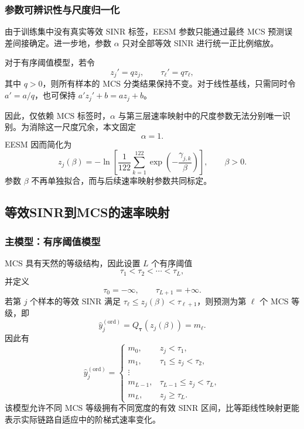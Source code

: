 \documentclass[bwprint]{gmcmthesis}
\numberwithin{figure}{section}
\begin{document}
\subsubsection{参数可辨识性与尺度归一化}

由于训练集中没有真实等效 SINR 标签，EESM 参数只能通过最终 MCS 预测误差间接确定。进一步地，参数 $\alpha$ 只对全部等效 SINR 进行统一正比例缩放。

对于有序阈值模型，若令
\begin{equation}
	z_j'=q z_j,
	\qquad
	\tau_\ell'=q\tau_\ell,
\end{equation}
其中 $q>0$，则所有样本的 MCS 分类结果保持不变。对于线性基线，只需同时令 $a'=a/q$，也可保持 $a'z_j'+b=az_j+b$。

因此，仅依赖 MCS 标签时，$\alpha$ 与第三层速率映射中的尺度参数无法分别唯一识别。为消除这一尺度冗余，本文固定
\begin{equation}
	\boxed{\alpha=1.}
	\label{eq:alpha}
\end{equation}
EESM 因而简化为
\begin{equation}
	\boxed{
	z_j(\beta)
	=
	-\ln\left[\frac{1}{122}\sum_{k=1}^{122}\exp\left(-\frac{\gamma_{j,k}}{\beta}\right)\right],
	\qquad \beta>0.
	}
	\label{eq:eesm-z}
\end{equation}
参数 $\beta$ 不再单独拟合，而与后续速率映射参数共同标定。

\subsection{等效SINR到MCS的速率映射}

\subsubsection{主模型：有序阈值模型}

MCS 具有天然的等级结构，因此设置 $L$ 个有序阈值
\begin{equation}
	\tau_1<\tau_2<\cdots<\tau_L,
\end{equation}
并定义
\begin{equation}
	\tau_0=-\infty,
	\qquad
	\tau_{L+1}=+\infty.
\end{equation}
若第 $j$ 个样本的等效 SINR 满足 $\tau_\ell\le z_j(\beta)<\tau_{\ell+1}$，则预测为第 $\ell$ 个 MCS 等级，即
\begin{equation}
	\boxed{
	\widehat y_j^{(\mathrm{ord})}
	=
	Q_{\boldsymbol{\tau}}\left(z_j(\beta)\right)
	=
	m_\ell.
	}
	\label{eq:threshold-model}
\end{equation}
因此有
\begin{equation}
	\widehat y_j^{(\mathrm{ord})}
	=
	\begin{cases}
	m_0, & z_j<\tau_1,\\
	m_1, & \tau_1\le z_j<\tau_2,\\
	\vdots\\
	m_{L-1}, & \tau_{L-1}\le z_j<\tau_L,\\
	m_L, & z_j\ge\tau_L.
	\end{cases}
\end{equation}
该模型允许不同 MCS 等级拥有不同宽度的有效 SINR 区间，比等距线性映射更能表示实际链路自适应中的阶梯式速率变化。
\end{document}
